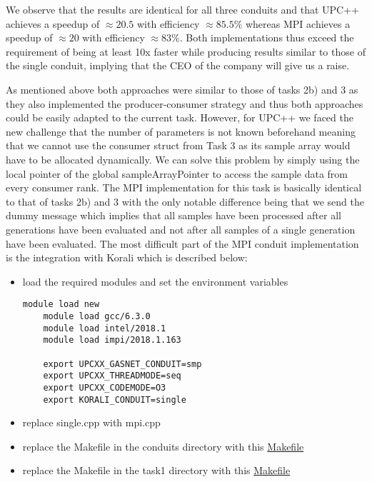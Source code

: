 \documentclass[11pt]{article}
\begin{document}
    We observe that the results are identical for all three conduits and
    that UPC++ achieves a speedup of $\approx 20.5$ with efficiency
    $\approx 85.5\%$ whereas MPI achieves a speedup of $\approx 20$ with
    efficiency $\approx 83\%$.
    Both implementations thus exceed the requirement of being at least 10x
    faster while producing results similar to those of the single conduit,
    implying that the CEO of the company will give us a raise.

    As mentioned above both approaches were similar to those of tasks 2b)
    and 3 as they also implemented the producer-consumer strategy and thus
    both approaches could be easily adapted to the current task.
    However, for UPC++ we faced the new challenge that the number of
    parameters is not known beforehand meaning that we cannot use the consumer
    struct from Task 3 as its sample array would have to be allocated
    dynamically.
    We can solve this problem by simply using the local pointer of the
    global sampleArrayPointer to access the sample data from every consumer
    rank.
    The MPI implementation for this task is basically identical to that of
    tasks 2b) and 3 with the only notable difference being that we send the
    dummy message which implies that all samples have been processed after
    all generations have been evaluated and not after all samples of a
    single generation have been evaluated.
    The most difficult part of the MPI conduit implementation is the
    integration with Korali which is described below:

    \begin{itemize}
        \item load the required modules and set the environment variables
        \begin{lstlisting}[basicstyle=\footnotesize]
    module load new
    module load gcc/6.3.0
    module load intel/2018.1
    module load impi/2018.1.163

    export UPCXX_GASNET_CONDUIT=smp
    export UPCXX_THREADMODE=seq
    export UPCXX_CODEMODE=O3
    export KORALI_CONDUIT=single
        \end{lstlisting}
        \item replace single.cpp with mpi.cpp
        \item replace the Makefile in the conduits directory
        with this
        \href{https://github.com/anianruoss/HPCSE-II/blob/master/exercise04/task1/conduits/Makefile_MPI}{Makefile}
        \item replace the Makefile in the task1 directory with this
        \href{https://github.com/anianruoss/HPCSE-II/blob/master/exercise04/task1/Makefile_MPI}{Makefile}
    \end{itemize}
\end{document}
